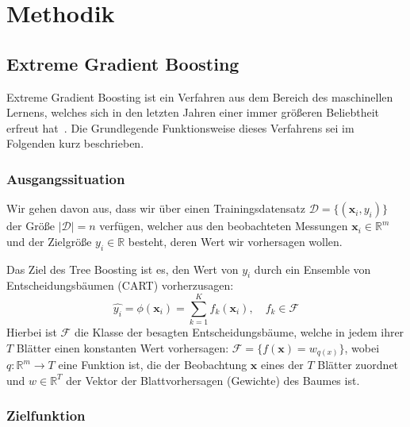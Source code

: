 \section{Methodik}

\subsection{Extreme Gradient Boosting}

Extreme Gradient Boosting ist ein Verfahren aus dem Bereich des maschinellen Lernens, welches sich
in den letzten Jahren einer immer gr\"o{\ss}eren Beliebtheit erfreut hat~\cite{XGBoost}.
Die Grundlegende Funktionsweise dieses Verfahrens sei im Folgenden kurz beschrieben.

\subsubsection{Ausgangssituation}

Wir gehen davon aus, dass wir \"uber einen Trainingsdatensatz $\mathcal{D} = \{(\mathbf{x}_i, y_i)\}$
der Gr\"o{\ss}e $\left| \mathcal{D} \right| = n$ verf\"ugen, welcher aus den beobachteten Messungen $\mathbf{x}_i \in \mathbb{R}^m$
und der Zielgr\"o{\ss}e $y_i \in \mathbb{R}$ besteht, deren Wert wir vorhersagen wollen.

Das Ziel des Tree Boosting ist es, den Wert von $y_i$ durch ein Ensemble von Entscheidungsb\"aumen (CART)
vorherzusagen:
\begin{equation}
    \hat{y_i} = \phi(\mathbf{x}_i) =  \sum_{k=1}^K f_k(\mathbf{x}_i), \quad f_k \in \mathcal{F}
\end{equation}
Hierbei ist $\mathcal{F}$ die Klasse der besagten Entscheidungsb\"aume, welche in jedem ihrer $T$ Bl\"atter
einen konstanten Wert vorhersagen: $\mathcal{F} = \{f(\mathbf{x}) = w_{q(x)}\}$, wobei $q: \mathbb{R}^m \rightarrow T$
eine Funktion ist, die der Beobachtung $\mathbf{x}$ eines der $T$ Bl\"atter zuordnet und $w \in \mathbb{R}^T$ der Vektor
der Blattvorhersagen (Gewichte) des Baumes ist.

\subsubsection{Zielfunktion}

